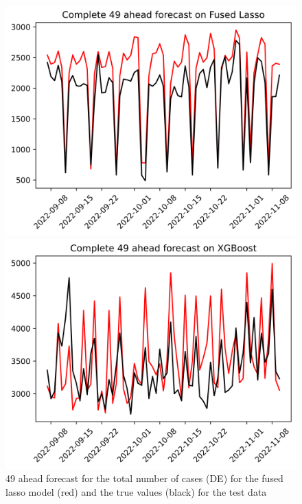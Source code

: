 \begin{figure}

\begin{minipage}{.32\textwidth}
  \centering
  \includegraphics[width=\linewidth]{pics/49_ah/DE_Complete_49_ahead_Fused Lasso.png}
  \caption{49 ahead forecast for the total number of cases (DE) for the fused lasso model (red) and the true values (black) for the test data}
  \label{fig:tot_cases_fc_49_flasso_DE}
\end{minipage}
\begin{minipage}{.32\textwidth}
  \centering
  \includegraphics[width=\linewidth]{pics/49_ah/Complete_49_ahead_XGBoost.png}

\end{minipage}
\end{figure}
